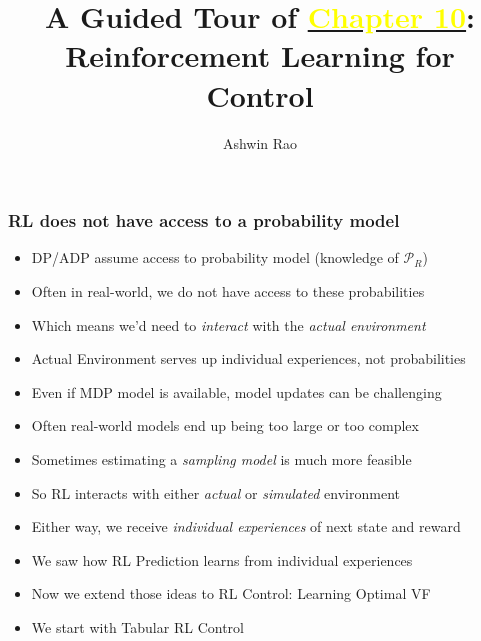 \documentclass[handout]{beamer}
\title[RL Control Chapter]{A Guided Tour of \href{http://stanford.edu/~ashlearn/RLForFinanceBook/book.pdf}{\underline{\textcolor{yellow}{Chapter 10}}}: \\ Reinforcement Learning for Control} %
\author{Ashwin Rao} %
\institute[Stanford] %
{ICME, Stanford University
}
\date %
\begin{document}
\lstset{language=Python}  
\begin{frame}
\titlepage %
\end{frame}


\begin{frame}
\frametitle{RL does not have access to a probability model}
\begin{itemize}[<+->]
\item DP/ADP assume access to probability model (knowledge of $\mathcal{P}_R$)
\item Often in real-world, we do not have access to these probabilities
\item Which means we'd need to {\em interact} with the {\em actual environment}
\item {Actual Environment} serves up individual experiences, not probabilities
\item Even if MDP model is available, model updates can be challenging
\item Often real-world models end up being too large or too complex
\item Sometimes estimating a {\em sampling model} is much more feasible
\item So RL interacts with either {\em actual} or {\em simulated} environment
\item Either way, we receive {\em individual experiences} of next state and reward
\item We saw how RL Prediction learns from individual experiences
\item Now we extend those ideas to RL Control: Learning Optimal VF
\item We start with Tabular RL Control
 \end{itemize}
\end{frame}
\end{document}
